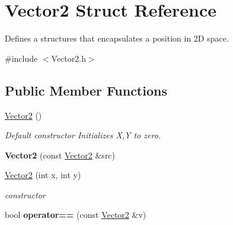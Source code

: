 \hypertarget{structVector2}{\section{Vector2 Struct Reference}
\label{structVector2}
}


Defines a structures that encapsulates a position in 2\-D space.  




{\ttfamily \#include $<$Vector2.\-h$>$}

\subsection*{Public Member Functions}
\begin{DoxyCompactItemize}
\item 
\hypertarget{structVector2_a22104d1809be26a419ef1f959e3761bf}{\hyperlink{structVector2_a22104d1809be26a419ef1f959e3761bf}{Vector2} ()}\label{structVector2_a22104d1809be26a419ef1f959e3761bf}

\begin{DoxyCompactList}\small\item\em Default constructor Initializes X,Y to zero. \end{DoxyCompactList}\item 
\hypertarget{structVector2_a5292d22e63825ec0e90e1574825c9570}{{\bfseries Vector2} (const \hyperlink{structVector2}{Vector2} \&src)}\label{structVector2_a5292d22e63825ec0e90e1574825c9570}

\item 
\hyperlink{structVector2_a321cf468f0b0caa050fc802f29af48ee}{Vector2} (int x, int y)
\begin{DoxyCompactList}\small\item\em constructor \end{DoxyCompactList}\item 
\hypertarget{structVector2_af6ee11c85864fe0161ec0e1f477ce882}{bool {\bfseries operator==} (const \hyperlink{structVector2}{Vector2} \&v)}\label{structVector2_af6ee11c85864fe0161ec0e1f477ce882}

\end{DoxyCompactItemize}
